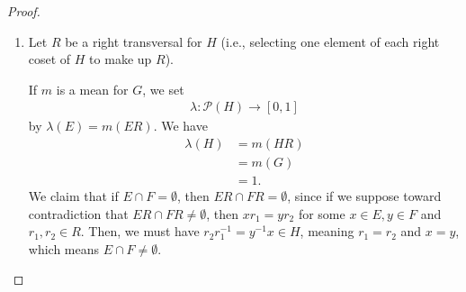 \documentclass[10pt]{mypackage}
\begin{document}
\begin{proof}\hfill
  \begin{enumerate}[(1)]
    \item Let $R$ be a right transversal for $H$ (i.e., selecting one element of each right coset of $H$ to make up $R$).\newline

      If $m$ is a mean for $G$, we set
      \begin{align*}
        \lambda\colon \mathcal{P}\left(H\right) \rightarrow [0,1]
      \end{align*}
      by $\lambda(E) = m\left(ER\right)$. We have
      \begin{align*}
        \lambda\left(H\right) &= m\left(HR\right)\\
                              &= m\left(G\right)\\
                              &= 1.
      \end{align*}
      We claim that if $E\cap F = \emptyset$, then $ER\cap FR = \emptyset$, since if we suppose toward contradiction that $ER \cap FR \neq \emptyset$, then $xr_1 = yr_2$ for some $ x\in E,y\in F$ and $r_1,r_2\in R$. Then, we must have $r_2r_1^{-1} = y^{-1}x \in H$, meaning $r_1 = r_2$ and $x = y$, which means $E\cap F \neq \emptyset$.\newline


\end{enumerate}
\end{proof}
\end{document}
